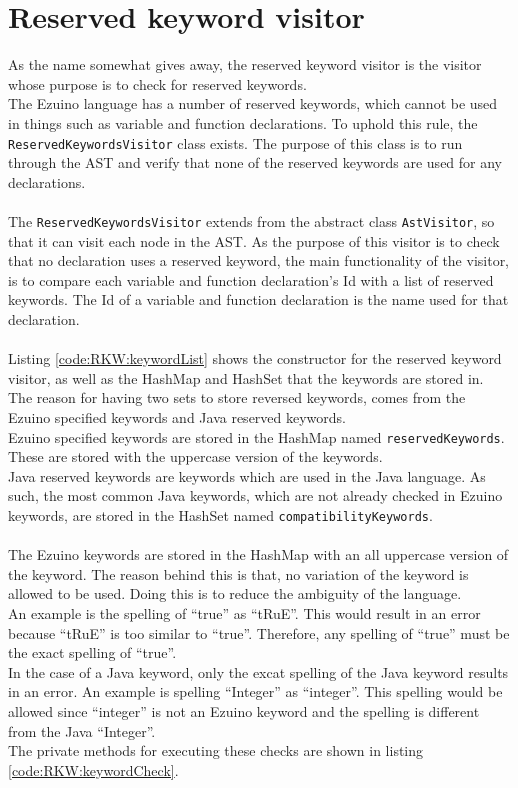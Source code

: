 \section{Reserved keyword visitor}
As the name somewhat gives away, the reserved keyword visitor is the visitor whose purpose is to check for reserved keywords.\\
The Ezuino language has a number of reserved keywords, which cannot be used in things such as variable and function declarations. To uphold this rule, the \texttt{ReservedKeywordsVisitor} class exists. The purpose of this class is to run through the AST and verify that none of the reserved keywords are used for any declarations.
\\\\
The \texttt{ReservedKeywordsVisitor} extends from the abstract class \texttt{AstVisitor}, so that it can visit each node in the AST. As the purpose of this visitor is to check that no declaration uses a reserved keyword, the main functionality of the visitor, is to compare each variable and function declaration's Id with a list of reserved keywords. The Id of a variable and function declaration is the name used for that declaration.
\\\\
Listing \ref{code:RKW:keywordList} shows the constructor for the reserved keyword visitor, as well as the HashMap and HashSet that the keywords are stored in. The reason for having two sets to store reversed keywords, comes from the Ezuino specified keywords and Java reserved keywords.\\
Ezuino specified keywords are stored in the HashMap named \texttt{reservedKeywords}. These are stored with the uppercase version of the keywords.\\
Java reserved keywords are keywords which are used in the Java language. As such, the most common Java keywords, which are not already checked in Ezuino keywords, are stored in the HashSet named \texttt{compatibilityKeywords}.
\\\\
The Ezuino keywords are stored in the HashMap with an all uppercase version of the keyword. The reason behind this is that, no variation of the keyword is allowed to be used. Doing this is to reduce the ambiguity of the language.\\
An example is the spelling of “true” as “tRuE”. This would result in an error because “tRuE” is too similar to “true”. Therefore, any spelling of “true” must be the exact spelling of “true”.\\
In the case of a Java keyword, only the excat spelling of the Java keyword results in an error. An example is spelling “Integer” as “integer”. This spelling would be allowed since “integer” is not an Ezuino keyword and the spelling is different from the Java “Integer”.\\
The private methods for executing these checks are shown in listing \ref{code:RKW:keywordCheck}.\\

